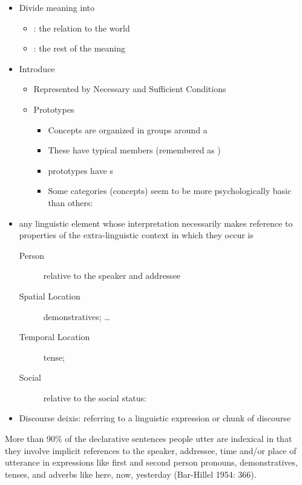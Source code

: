 \documentclass[headrule,footrule]{foils}
\begin{document}

\begin{itemize}
\item Divide meaning into
  \begin{itemize}
  \item {}: the relation to the world
  \item {}: the rest of the meaning
  \end{itemize}
\item Introduce 
  \begin{itemize}
  \item Represented by Necessary and Sufficient Conditions
  \item  Prototypes
    \begin{itemize}
    \item Concepts are organized in groups around a 
    \item These have typical members (remembered as ) 
\item prototypes have s
\item Some categories (concepts) seem to be more psychologically basic than others: 
\end{itemize}
\end{itemize}
\end{itemize}
\begin{itemize}
\item any linguistic element whose interpretation
  necessarily makes reference to properties of the
  extra-linguistic context in which they occur is 
  \begin{description}
  \item[Person] relative to the speaker and addressee
  \item[Spatial Location] demonstratives; \ldots
  \item[Temporal Location] tense; 
  \item[Social] relative to the social status: 
  \end{description}
\item Discourse deixis: referring to a linguistic expression or chunk of discourse
\end{itemize}

More than 90\% of the declarative sentences people utter are indexical
in that they involve implicit references to the speaker, addressee,
time and/or place of utterance in expressions like first and second
person pronouns, demonstratives, tenses, and adverbs like here, now,
yesterday (Bar-Hillel 1954: 366).
\end{document}
